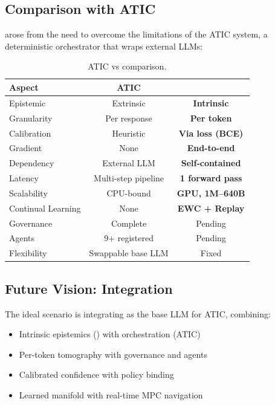 \subsection{Comparison with ATIC}

\aletheion{} arose from the need to overcome the limitations of the
ATIC system, a deterministic orchestrator that wraps external LLMs:

\begin{table}[H]
\centering
\caption{ATIC vs \aletheion{} comparison.}
\label{tab:vs_atic}
\begin{tabular}{lcc}
\toprule
\textbf{Aspect} & \textbf{ATIC} & \textbf{\aletheion{}} \\
\midrule
Epistemic & Extrinsic & \textbf{Intrinsic} \\
Granularity & Per response & \textbf{Per token} \\
Calibration & Heuristic & \textbf{Via loss (BCE)} \\
Gradient & None & \textbf{End-to-end} \\
Dependency & External LLM & \textbf{Self-contained} \\
Latency & Multi-step pipeline & \textbf{1 forward pass} \\
Scalability & CPU-bound & \textbf{GPU, 1M--640B} \\
Continual Learning & None & \textbf{EWC + Replay} \\
\midrule
Governance & Complete & Pending \\
Agents & 9+ registered & Pending \\
Flexibility & Swappable base LLM & Fixed \\
\bottomrule
\end{tabular}
\end{table}

\subsection{Future Vision: Integration}

The ideal scenario is integrating \aletheion{} as the base LLM for ATIC,
combining:

\begin{itemize}
    \item Intrinsic epistemics (\aletheion{}) with orchestration (ATIC)
    \item Per-token tomography with governance and agents
    \item Calibrated confidence with policy binding
    \item Learned manifold with real-time MPC navigation
\end{itemize}

